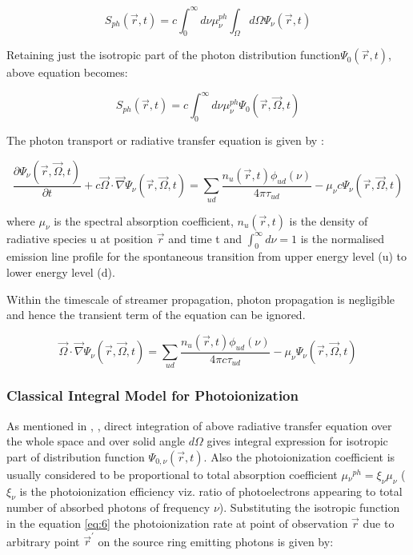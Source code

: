 \documentclass{article}
\begin{document}
\begin{equation}
S_{ph} (\vec{r},t) = c\int_{0}^{\infty}d\nu \mu_{\nu}^{ph}  \int_{\Omega}d\Omega\Psi_\nu(\vec{r},t)
\end{equation}

Retaining just the isotropic part of the photon distribution function$\Psi_0(\vec{r},t)$, above equation becomes:

\begin{equation} \label{eq:6}
S_{ph} (\vec{r},t) = c\int_{0}^{\infty}d\nu \mu_{\nu}^{ph}  \Psi_0(\vec{r},\vec{\Omega},t)
\end{equation}

The photon transport or radiative transfer equation is given by :

\begin{equation}
\frac{\partial\Psi_\nu(\vec{r},\vec{\Omega},t)}{\partial t} + c\vec{\Omega} \cdot \vec{\nabla} \Psi_\nu(\vec{r},\vec{\Omega},t) = \sum_{ud} \frac{n_u (\vec{r},t)\phi_{ud} (\nu)}{4 \pi \tau_{ud}} - \mu_\nu c \Psi_\nu(\vec{r},\vec{\Omega},t)
\end{equation}

where $\mu_\nu$ is the spectral absorption coefficient, $n_u(\vec{r},t)$ is the density of radiative species u at position $\vec{r}$ and time t and $\int_{0}^{\infty}d\nu = 1$ is the normalised emission line profile for the spontaneous transition from upper energy level (u) to lower energy level (d). 

Within the timescale of streamer propagation, photon propagation is negligible and hence the transient term of the equation can be ignored. 

\begin{equation}
\vec{\Omega} \cdot \vec{\nabla} \Psi_\nu(\vec{r},\vec{\Omega},t) = \sum_{ud} \frac{n_u (\vec{r},t)\phi_{ud} (\nu)}{4 \pi c \tau_{ud}} - \mu_\nu \Psi_\nu(\vec{r},\vec{\Omega},t)
\end{equation}

\subsubsection{Classical Integral Model for Photoionization}

As mentioned in \cite{Bourdon2007EfficientEquations}, \cite{ZhelezniakM.B.andMnatsakanianA.K.andSizykh1982PhotoionizationDischarge}, direct integration of above radiative transfer equation over the whole space and over solid angle $d\Omega$ gives integral expression for isotropic part of distribution function $\Psi_{0,\nu}(\vec{r},t)$. Also the photoionization coefficient is usually considered to be proportional to total absorption coefficient $\mu{_\nu}^{ph}= \xi_\nu \mu_\nu$ ($\xi_\nu$ is the photoionization efficiency viz. ratio of photoelectrons appearing to total number of absorbed photons of frequency $\nu$). Substituting the isotropic function in the equation \ref{eq:6} the photoionization rate at point of observation $\vec{r}$ due to arbitrary point $\vec{r}^'$ on the source ring emitting photons is given by:
\end{document}
